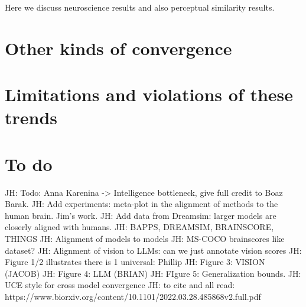 \documentclass{article}
\newcommand{\jh}[1]{{\;\color{red}JH: #1}}
\theoremstyle{plain}
\theoremstyle{definition}
\theoremstyle{remark}
\begin{document}
Here we discuss neuroscience results and also perceptual similarity results.


\section{Other kinds of convergence}


\section{Limitations and violations of these trends}



\newpage

\section{To do}

\jh{Todo: Anna Karenina -> Intelligence bottleneck, give full credit to Boaz Barak.}
\jh{Add experiments: meta-plot in the alignment of methods to the human brain. Jim's work.}
\jh{Add data from Dreamsim: larger models are closerly aligned with humans.}
\jh{BAPPS, DREAMSIM, BRAINSCORE, THINGS}
\jh{Alignment of models to models}
\jh{MS-COCO brainscores like dataset?}
\jh{Alignment of vision to LLMs: can we just annotate vision scores}
\jh{Figure 1/2 illustrates there is 1 universal: Phillip}
\jh{Figure 3: VISION (JACOB)}
\jh{Figure 4: LLM (BRIAN)}
\jh{FIgure 5: Generalization bounds.}
\jh{UCE style for cross model convergence}
\jh{to cite  and all read: https://www.biorxiv.org/content/10.1101/2022.03.28.485868v2.full.pdf}


{


}
\end{document}
